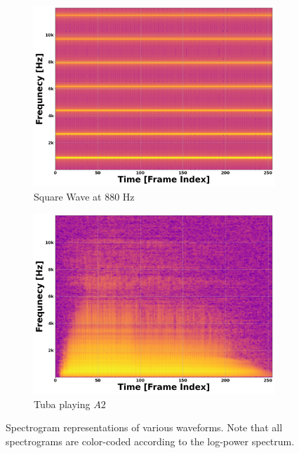 \documentclass[12pt,letterpaper]{article}
\begin{document}
\begin{figure}[H]
	\begin{subfigure}[b]{0.45\textwidth}
	\centering
	\includegraphics[scale=0.2]{../FiguresSpectrogram/SquareWave-880Hz}
	\caption{Square Wave at $880$ Hz}
	\end{subfigure}
	\hfill
	\begin{subfigure}[b]{0.45\textwidth}
	\centering
	\includegraphics[scale=0.2]{../FiguresSpectrogram/Tuba-A2}
	\caption{Tuba playing $A2$}
	\end{subfigure}
\caption{Spectrogram representations of various waveforms. Note that all spectrograms are color-coded according to the log-power spectrum.}
\label{fig-Spectrograms}
\end{figure}
\end{document}
